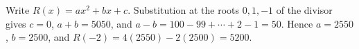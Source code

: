 Write $R(x)=ax^2+bx+c$. Substitution at the roots $0,1,-1$ of the divisor gives $c=0$, $a+b=5050$, and $a-b=100-99+\cdots+2-1=50$. Hence $a=2550$, $b=2500$, and $R(-2)=4(2550)-2(2500)=\boxed{5200}$.
